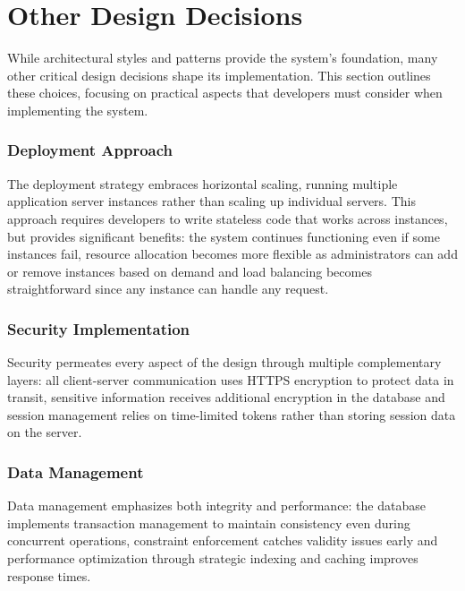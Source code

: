 \section{Other Design Decisions}
While architectural styles and patterns provide the system's foundation, many other critical design decisions shape its implementation.
This section outlines these choices, focusing on practical aspects that developers must consider when implementing the system.

\subsubsection{Deployment Approach}
The deployment strategy embraces horizontal scaling, running multiple application server instances rather than scaling up individual servers.
This approach requires developers to write stateless code that works across instances, but provides significant benefits: the system continues functioning even if some instances fail, resource allocation becomes more flexible as administrators can add or remove instances based on demand and load balancing becomes straightforward since any instance can handle any request.

\subsubsection{Security Implementation}
Security permeates every aspect of the design through multiple complementary layers: all client-server communication uses HTTPS encryption to protect data in transit, sensitive information receives additional encryption in the database and session management relies on time-limited tokens rather than storing session data on the server.

\subsubsection{Data Management}
Data management emphasizes both integrity and performance: the database implements transaction management to maintain consistency even during concurrent operations, constraint enforcement catches validity issues early and performance optimization through strategic indexing and caching improves response times.
